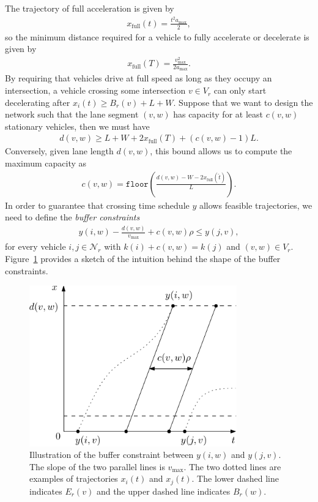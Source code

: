 \documentclass[a4paper]{article}
\theoremstyle{definition}
\theoremstyle{plain}
\begin{document}
The trajectory of full acceleration is given by
\begin{align*}
  x_{\text{full}}(t) = \frac{t^{2} a_{\max}}{2} ,
\end{align*}
so the minimum distance required for a vehicle to fully accelerate or decelerate
is given by
\begin{align*}
  x_{\text{full}}(T) = \frac{v_{\max}^{2}}{2 a_{\max}} .
\end{align*}
%
By requiring that vehicles drive at full speed as long as they occupy an
intersection, a vehicle crossing some intersection $v \in V_{r}$ can only start
decelerating after $x_{i}(t) \geq B_{r}(v) + L + W$.
%
Suppose that we want to design the network such that the lane segment $(v, w)$
has capacity for at least $c(v, w)$ stationary vehicles, then we must have
\begin{align*}
  d(v,w) \geq L + W + 2 x_{\text{full}}(T) + (c(v, w) - 1) L.
\end{align*}
Conversely, given lane length $d(v,w)$, this bound allows us to compute the
maximum capacity as
\begin{align}\label{eq:max_capacity}
  c(v, w) = \texttt{floor}\left( \frac{d(v,w) - W - 2x_{\text{full}}(\hat{t})}{L} \right) .
\end{align}
%
In order to guarantee that crossing time schedule $y$ allows feasible
trajectories, we need to define the \textit{buffer constraints}
\begin{align}
  \label{eq:buffer_constraints}
y(i, w) - \frac{d(v,w)}{v_{\max}} + c(v,w) \rho \leq y(j, v) ,
\end{align}
for every vehicle $i, j \in \mathcal{N}_{r}$ with $k(i) + c(v,w) = k(j)$ and
$(v, w) \in V_{r}$. Figure~\ref{fig:buffer_constraints} provides a sketch of the
intuition behind the shape of the buffer constraints.

\begin{figure}[h]
  \centering
  \includegraphics[width=0.8\textwidth]{figures/capacity_constraint.pdf}
  \caption{Illustration of the buffer constraint between $y(i, w)$ and
    $y(j, v)$. The slope of the two parallel lines is $v_{\max}$. The two dotted
    lines are examples of trajectories $x_{i}(t)$ and $x_{j}(t)$. The lower
    dashed line indicates $E_{r}(v)$ and the upper dashed line indicates
    $B_{r}(w)$.}\label{fig:buffer_constraints}
\end{figure}
\end{document}
